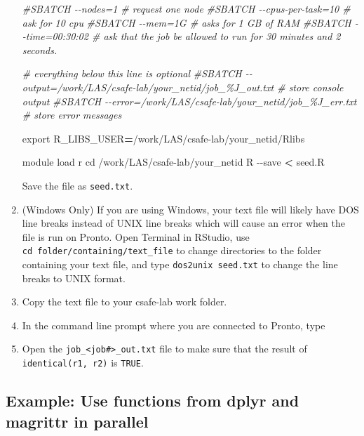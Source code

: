 \documentclass[
]{book}
\newenvironment{Shaded}{\begin{snugshade}}{\end{snugshade}}
\newcommand{\AttributeTok}[1]{\textcolor[rgb]{0.77,0.63,0.00}{#1}}
\newcommand{\BuiltInTok}[1]{#1}
\newcommand{\CommentTok}[1]{\textcolor[rgb]{0.56,0.35,0.01}{\textit{#1}}}
\newcommand{\ExtensionTok}[1]{#1}
\newcommand{\NormalTok}[1]{#1}
\newcommand{\OperatorTok}[1]{\textcolor[rgb]{0.81,0.36,0.00}{\textbf{#1}}}
\newcommand{\VariableTok}[1]{\textcolor[rgb]{0.00,0.00,0.00}{#1}}
\begin{document}
\begin{enumerate}
\begin{Shaded}
\begin{Highlighting}[]
\CommentTok{\#SBATCH {-}{-}nodes=1 \# request one node}
\CommentTok{\#SBATCH {-}{-}cpus{-}per{-}task=10  \# ask for 10 cpu}
\CommentTok{\#SBATCH {-}{-}mem=1G \#  asks for 1 GB of RAM}
\CommentTok{\#SBATCH {-}{-}time=00:30:02 \# ask that the job be allowed to run for 30 minutes and 2 seconds.}

\CommentTok{\# everything below this line is optional}
\CommentTok{\#SBATCH {-}{-}output=/work/LAS/csafe{-}lab/your\_netid/job\_\%J\_out.txt \# store console output}
\CommentTok{\#SBATCH {-}{-}error=/work/LAS/csafe{-}lab/your\_netid/job\_\%J\_err.txt \# store error messages}

\BuiltInTok{export} \VariableTok{R\_LIBS\_USER}\OperatorTok{=}\NormalTok{/work/LAS/csafe{-}lab/your\_netid/Rlibs}

\ExtensionTok{module}\NormalTok{ load r}
\BuiltInTok{cd}\NormalTok{ /work/LAS/csafe{-}lab/your\_netid}
\ExtensionTok{R} \AttributeTok{{-}{-}save} \OperatorTok{\textless{}}\NormalTok{ seed.R}
\end{Highlighting}
\end{Shaded}

  Save the file as \texttt{seed.txt}.
\item
  (Windows Only) If you are using Windows, your text file will likely have DOS line breaks instead of UNIX line breaks which will cause an error when the file is run on Pronto. Open Terminal in RStudio, use \texttt{cd\ folder/containing/text\_file} to change directories to the folder containing your text file, and type \texttt{dos2unix\ seed.txt} to change the line breaks to UNIX format.
\item
  Copy the text file to your csafe-lab work folder.
\item
  In the command line prompt where you are connected to Pronto, type

\begin{Shaded}
\end{Shaded}
\item
  Open the \texttt{job\_\textless{}job\#\textgreater{}\_out.txt} file to make sure that the result of \texttt{identical(r1,\ r2)} is \texttt{TRUE}.
\end{enumerate}

\hypertarget{ex-packages-parallel}{%
\subsection{Example: Use functions from dplyr and magrittr in parallel}\label{ex-packages-parallel}}
\end{document}
